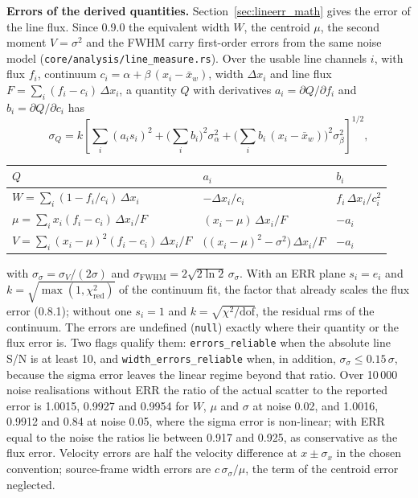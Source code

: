 \documentclass[11pt,a4paper]{article}
\newcommand{\code}[1]{\texttt{\small #1}}
\begin{document}
    \textbf{Errors of the derived quantities.} Section~\ref{sec:lineerr_math} gives the error of the line flux. Since 0.9.0 the equivalent width $W$, the centroid $\mu$, the second moment $V = \sigma^2$ and the FWHM carry first-order errors from the same noise model (\code{core/analysis/line\_measure.rs}). Over the usable line channels $i$, with flux $f_i$, continuum $c_i = \alpha + \beta\,(x_i - \bar{x}_w)$, width $\Delta x_i$ and line flux $F = \sum_i (f_i - c_i)\,\Delta x_i$, a quantity $Q$ with derivatives $a_i = \partial Q / \partial f_i$ and $b_i = \partial Q / \partial c_i$ has
    \begin{equation}
        \sigma_Q = k \left[ \sum_i (a_i s_i)^2 + \Big(\sum_i b_i\Big)^2 \sigma_\alpha^2 + \Big(\sum_i b_i\,(x_i - \bar{x}_w)\Big)^2 \sigma_\beta^2 \right]^{1/2},
    \end{equation}
    \begin{center}
    \small
    \begin{tabular}{lll}
        \toprule
        $Q$ & $a_i$ & $b_i$ \\
        \midrule
        $W = \sum_i (1 - f_i/c_i)\,\Delta x_i$ & $-\Delta x_i / c_i$ & $f_i\,\Delta x_i / c_i^2$ \\
        $\mu = \sum_i x_i (f_i - c_i)\,\Delta x_i / F$ & $(x_i - \mu)\,\Delta x_i / F$ & $-a_i$ \\
        $V = \sum_i (x_i - \mu)^2 (f_i - c_i)\,\Delta x_i / F$ & $\big((x_i - \mu)^2 - \sigma^2\big)\,\Delta x_i / F$ & $-a_i$ \\
        \bottomrule
    \end{tabular}
    \end{center}
    with $\sigma_\sigma = \sigma_V / (2\sigma)$ and $\sigma_{\text{FWHM}} = 2\sqrt{2\ln 2}\,\sigma_\sigma$. With an ERR plane $s_i = e_i$ and $k = \sqrt{\max(1, \chi^2_{\text{red}})}$ of the continuum fit, the factor that already scales the flux error (0.8.1); without one $s_i = 1$ and $k = \sqrt{\chi^2/\text{dof}}$, the residual rms of the continuum. The errors are undefined (\code{null}) exactly where their quantity or the flux error is. Two flags qualify them: \code{errors\_reliable} when the absolute line S/N is at least 10, and \code{width\_errors\_reliable} when, in addition, $\sigma_\sigma \le 0.15\,\sigma$, because the sigma error leaves the linear regime beyond that ratio. Over 10\,000 noise realisations without ERR the ratio of the actual scatter to the reported error is 1.0015, 0.9927 and 0.9954 for $W$, $\mu$ and $\sigma$ at noise 0.02, and 1.0016, 0.9912 and 0.84 at noise 0.05, where the sigma error is non-linear; with ERR equal to the noise the ratios lie between 0.917 and 0.925, as conservative as the flux error. Velocity errors are half the velocity difference at $x \pm \sigma_x$ in the chosen convention; source-frame width errors are $c\,\sigma_\sigma / \mu$, the term of the centroid error neglected.
\end{document}
